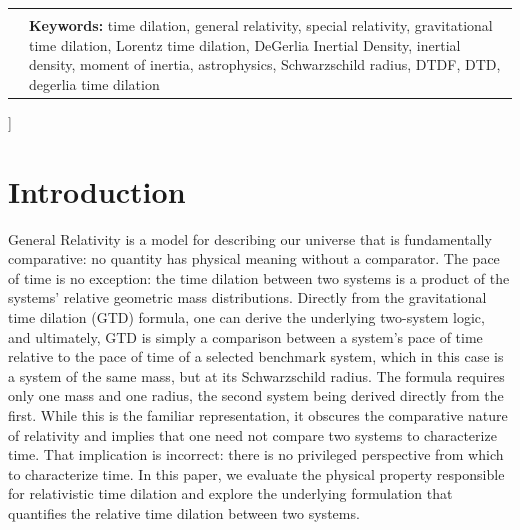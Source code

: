 \documentclass[twoside,twocolumn,9pt,fleqn]{article}
\begin{document}
\begin{@twocolumnfalse}
\begin{tabular}{m{4.5cm} p{13.5cm} }
 & \vspace{0.15cm} \\
 & \noindent\small{\textbf{Keywords:} time dilation, general relativity, special relativity, gravitational time dilation, Lorentz time dilation, DeGerlia Inertial Density, inertial density, moment of inertia, astrophysics, Schwarzschild radius, DTDF, DTD, degerlia time dilation} \\
\end{tabular}

 \end{@twocolumnfalse} \vspace{0.6cm}

  ]

\renewcommand*\rmdefault{bch}\normalfont\upshape
\rmfamily
\vspace{-1cm}


\section{Introduction}
General Relativity\cite{einstein1915} is a model for describing our universe that is fundamentally comparative: no quantity has physical meaning without a comparator. The pace of time is no exception: the time dilation between two systems is a product of the systems' relative geometric mass distributions. Directly from the gravitational time dilation (GTD) formula, one can derive the underlying two-system logic, and ultimately, GTD is simply a comparison between a system's pace of time relative to the pace of time of a selected benchmark system, which in this case is a system of the same mass, but at its Schwarzschild radius. The formula requires only one mass and one radius, the second system being derived directly from the first. While this is the familiar representation, it obscures the comparative nature of relativity and implies that one need not compare two systems to characterize time. That implication is incorrect: there is no privileged perspective from which to characterize time. In this paper, we evaluate the physical property responsible for relativistic time dilation and explore the underlying formulation that quantifies the relative time dilation between two systems.
\end{document}
